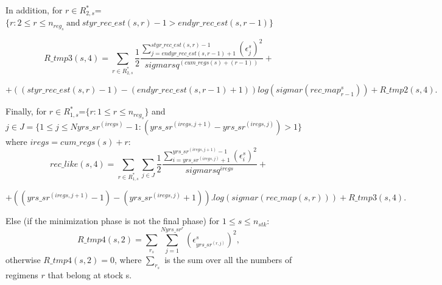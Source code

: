\documentclass{article}
\begin{document}
In addition, for $r\in R^*_{2,s}$=$\{r:2\leq r \leq n_{reg_s} \ \text{and} \ styr\_rec\_est(s,r)-1 > endyr\_rec\_est(s,r-1)\}$

\begin{equation}
    R\_tmp3(s,4) = \sum_{r\in R^*_{2,s}}\dfrac{1}{2}\dfrac{\displaystyle\sum_{j=endyr\_rec\_est(s,r-1)+1}^{styr\_rec\_est(s,r)-1}( \epsilon^s_j)^2}{sigmarsq^{(cum\_regs(s)+(r-1))}} + 
\end{equation}

\begin{equation*}
    + ((styr\_rec\_est(s,r)-1)-(endyr\_rec\_est(s,r-1)+1)) log(sigmar(rec\_map^s_{r-1})) + R\_tmp2(s,4).
\end{equation*}

Finally, for $r\in R^*_{1,s}$=$\{r: 1\leq r \leq n_{reg_s}\}$ and $j\in J=\{1\leq j\leq Nyrs\_sr^{(iregs)}-1: (yrs\_sr^{(iregs,j+1)}-yrs\_sr^{(iregs,j)}) > 1 \}$ where $iregs = cum\_regs(s)+r$:
\begin{equation}
     rec\_like(s,4)=  \sum_{r\in R^*_{1,s}}\sum_{j \in J}\dfrac{1}{2}\dfrac{\displaystyle\sum_{i=yrs\_sr^{(iregs,j)}+1}^{yrs\_sr^{(iregs,j+1)}-1}( \epsilon^s_i)^2}{sigmarsq^{iregs}} + 
\end{equation}

\begin{equation*}
    + ((yrs\_sr^{(iregs,j+1)}-1)-(yrs\_sr^{(iregs,j)}+1)).log(sigmar(rec\_map(s,r))) + R\_tmp3(s,4).
\end{equation*}

Else (if the minimization phase is not the final phase) for $1\leq s \leq n_{stk}$:
\begin{equation}
    R\_tmp4(s,2) = \sum_{r_s}\sum_{j=1}^{Nyrs\_sr^r}(\epsilon^s_{yrs\_sr^{(r,j)}})^2, 
\end{equation} 
otherwise $R\_tmp4(s,2)=0$,
where $\displaystyle\sum_{r_s}$ is the sum over all the numbers of regimens $r$ that belong at stock s.\\
\end{document}
